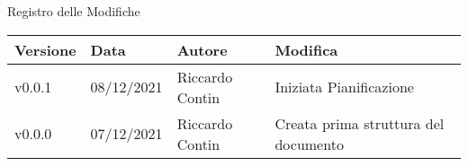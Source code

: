 \begin{center}
  \huge{Registro delle Modifiche}
\end{center}

\begin{center}
  \begin{tabular}{|p{2cm}|p{2cm}|p{3cm}|p{5cm}|}
    \hline
    \textbf{Versione} & \textbf{Data} & \textbf{Autore} & \textbf{Modifica}     \\ \hline
    v0.0.1            & 08/12/2021    & Riccardo Contin & Iniziata Pianificazione \\ \hline
    v0.0.0            & 07/12/2021    & Riccardo Contin & Creata prima struttura del documento \\ \hline
  \end{tabular}
\end{center}
